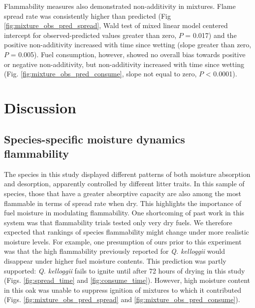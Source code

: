 \documentclass[letterpaper,12pt]{article}
\begin{document}
Flammability measures also demonstrated non-additivity in mixtures. Flame
spread rate was consistently higher than predicted (Fig
\ref{fig:mixture_obs_pred_spread}, Wald test of mixed linear model centered
intercept for observed-predicted values greater than zero, $P$ = 0.017) and the
positive non-additivity increased with time since wetting (slope greater than
zero, $P$ = 0.005). Fuel consumption, however, showed no overall bias towards
positive or negative non-additivity, but non-additivity increased with time
since wetting (Fig. \ref{fig:mixture_obs_pred_consume}, slope not equal to
zero, $P$ < 0.0001).

\section*{Discussion}

\subsection*{Species-specific moisture dynamics flammability}

The species in this study displayed different patterns of both moisture
absorption and desorption, apparently controlled by different litter traits. In
this sample of species, those that have a greater absorptive capacity are also
among the most flammable in terms of spread rate when dry. This highlights the
importance of fuel moisture in modulating flammability. One shortcoming of past
work in this system \citep{Magalhaes+Schwilk-2012} was that flammability trials
tested only very dry fuels. We therefore expected that rankings of species
flammability might change under more realistic moisture levels. For example,
one presumption of ours prior to this experiment was that the high flammability
previously reported for \emph{Q. kelloggii} \citep{Magalhaes+Schwilk-2012} would
disappear under higher fuel moisture contents. This prediction was partly
supported: \emph{Q. kelloggii} fails to ignite until after 72 hours of drying
in this study (Figs. \ref{fig:spread_time} and \ref{fig:consume_time}).
However, high moisture content in this oak was unable to suppress ignition of
mixtures to which it contributed (Figs. \ref{fig:mixture_obs_pred_spread} and
\ref{fig:mixture_obs_pred_consume}).
\end{document}
